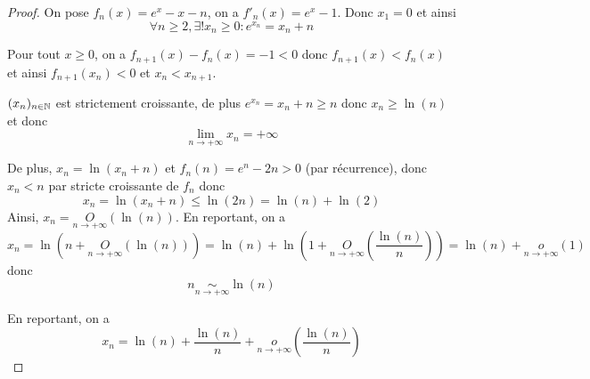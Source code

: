 \begin{proof}
	On pose $f_{n}(x)=e^{x}-x-n$, on a $f'_{n}(x)=e^{x}-1$. Donc $x_{1}=0$ et ainsi 
	\begin{equation}\boxed{\forall n\geqslant 2,\exists! x_n\geqslant0\colon e^{x_{n}}=x_{n}+n}\end{equation}

	Pour tout $x\geqslant0$, on a $f_{n+1}(x)-f_{n}(x)=-1<0$ donc $f_{n+1}(x)<f_{n}(x)$ et ainsi $f_{n+1}(x_{n})<0$ et $x_{n}<x_{n+1}$.

	$(x_{n})_{n\in\mathbb{N}}$ est strictement croissante, de plus $e^{x_{n}}=x_{n}+n\geqslant n$ donc $x_{n}\geqslant \ln(n)$ et donc 
	\begin{equation}\boxed{\lim\limits_{n\to+\infty}x_{n}=+\infty}\end{equation}

	De plus, $x_{n}=\ln(x_{n}+n)$ et $f_{n}(n)=e^{n}-2n>0$ (par récurrence), donc $x_{n}<n$ par stricte croissante de $f_{n}$ donc 
	\begin{equation}x_{n}=\ln(x_{n}+n)\leqslant \ln(2n)=\ln(n)+\ln(2)\end{equation}
	Ainsi, $x_{n}=\underset{n\to+\infty}{O}(\ln(n))$. En reportant, on a 
	\begin{equation}x_{n}=\ln(n+\underset{n\to+\infty}{O}(\ln(n)))=\ln(n)+\ln(1+\underset{n\to+\infty}{O}\left(\frac{\ln(n)}{n}\right))=\ln(n)+\underset{n\to+\infty}{o}(1)\end{equation}
	donc 
	\begin{equation}\boxed{n\underset{n\to+\infty}{\sim}\ln(n)}\end{equation}

	En reportant, on a 
	\begin{equation}\boxed{x_{n}=\ln(n)+\frac{\ln(n)}{n}+\underset{n\to+\infty}{o}\left(\frac{\ln(n)}{n}\right)}\end{equation}
\end{proof}

